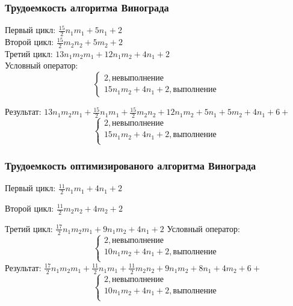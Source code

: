 \documentclass{article}
\begin{document}
		\subsubsection{Трудоемкость алгоритма Винограда}
		Первый цикл: $\frac{15}{2}n_{1}m_{1}+5n_{1}+2$\\
		Второй цикл: $\frac{15}{2}m_{2}n_{2}+5m_{2}+2$\\
		Третий цикл: $13n_{1}m_{2}m_{1}+12n_{1}m_{2}+4n_{1}+2$\\
		Условный оператор: 
		\begin{equation}
		\begin{cases}
			2, \text{невыполнение} \\
			15n_{1}m_{2} + 4n_{1} + 2 , \text{выполнение}
		\end{cases}
		\end{equation}
		
		Результат:	$13n_{1}m_{2}m_{1}+\frac{15}{2}n_{1}m_{1}+\frac{15}{2}m_{2}n_{2}+12n_{1}m_{2}+5n_{1}+5m_{2}+4n_{1}+6+$\newline
				\begin{equation}	
		\begin{cases}
			2, \text{невыполнение}\\
			15n_{1}m_{2} + 4n_{1} + 2, \text{выполнение}\\
	\end{cases} 
	\end{equation}
		\subsubsection{Трудоемкость оптимизированого алгоритма Винограда}
			Первый цикл: $\frac{11}{2}n_{1}m_{1}+4n_{1}+2$\par
		Второй цикл: $\frac{11}{2}m_{2}n_{2}+4m_{2}+2$\par
		Третий цикл: $\frac{17}{2}n_{1}m_{2}m_{1}+9n_{1}m_{2}+4n_{1}+2$\newline
		Условный оператор: 
		\begin{equation}
		\begin{cases}
			2, \text{невыполнение}\\
			10n_{1}m_{2} + 4n_{1} + 2, \text{выполнение}\\
		\end{cases}
		\end{equation}
		\newline
		Результат:
		$\frac{17}{2}n_{1}m_{2}m_{1}+\frac{11}{2}n_{1}m_{1}+\frac{11}{2}m_{2}n_{2}+9n_{1}m_{2}+8n_{1}+4m_{2}+6+$\newline
		\begin{equation}
		\begin{cases}
			2, \text{невыполнение}\\
			10n_{1}m_{2} + 4n_{1} + 2, \text{выполнение}\\
		\end{cases}
		\end{equation}
		
\end{document}
